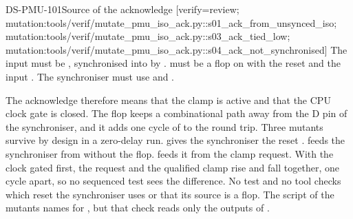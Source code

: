 \begin{requirement}{DS-PMU-101}{Source of the acknowledge}
[verify={review; mutation:tools/verif/mutate_pmu_iso_ack.py::s01_ack_from_unsynced_iso; mutation:tools/verif/mutate_pmu_iso_ack.py::s03_ack_tied_low; mutation:tools/verif/mutate_pmu_iso_ack.py::s04_ack_not_synchronised}]
The input  must be , synchronised into  by .  must be a flop on  with the reset  and the input . The synchroniser must use  and .
\end{requirement}
\begin{information}
The acknowledge therefore means that the clamp is active and that the CPU clock gate is closed. The flop keeps a combinational path away from the D pin of the synchroniser, and it adds one cycle of  to the round trip. Three mutants survive by design in a zero-delay run.  gives the synchroniser the reset .  feeds the synchroniser from  without the flop.  feeds it from the clamp request. With the clock gated first, the request and the qualified clamp rise and fall together, one cycle apart, so no sequenced test sees the difference. No test and no tool checks which reset the synchroniser uses or that its source is a flop. The script of the mutants names  for , but that check reads only the outputs of .
\end{information}

